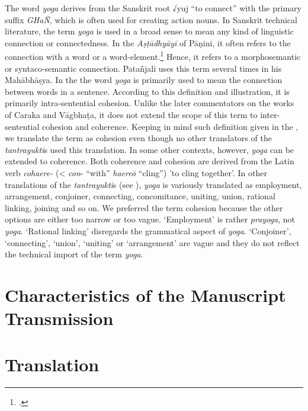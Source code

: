 The word \emph{yoga} derives from the Sanskrit root √yuj “to connect” with the primary suffix \emph{GHaÑ}, which is often used for creating action nouns. In Sanskrit technical literature, the term \emph{yoga} is used in a broad sense to mean any kind of linguistic connection or connectedness. In the \emph{Aṣṭādhyāyī} of Pāṇini, it often refers to the connection with a word or a word-element.\footnote{\cite[64]{josh-1991}.} Hence, it refers to a morphosemantic or syntaco-semantic connection. Patañjali uses this term several times in his Mahābhāṣya. In the \SS the word \emph{yoga} is primarily used to mean the connection between words in a sentence. According to this definition and illustration, it is primarily intra-sentential cohesion. Unlike the later commentators on the works of Caraka and Vāgbhaṭa, it does not extend the scope of this term to inter-sentential cohesion and coherence. Keeping in mind such definition given in the \SS, we translate the term as cohesion even though no other translators of the \emph{tantrayukti}s used this translation. In some other contexts, however, \emph{yoga} can be extended to coherence. Both coherence and cohesion are derived from the Latin verb \emph{cohaere-} (< \emph{con}- “with” \emph{haereō} “cling”) 'to cling together'.  In other translations of the \emph{tantrayukti}s (see \pageref{tantra-trans}), \emph{yoga} is variously translated as employment, arrangement, conjoiner, connecting, concomitance, uniting, union, rational linking, joining and so on. We preferred the term cohesion because the other options are either too narrow or too vague. `Employment' is rather \emph{prayoga}, not \emph{yoga}. `Rational linking' disregards the grammatical aspect of \emph{yoga}. `Conjoiner', `connecting', `union', `uniting' or `arrangement' are vague and they do not reflect the technical import of the term \emph{yoga}.   



\section{Characteristics of the Manuscript Transmission}


\newpage
\section{Translation}

